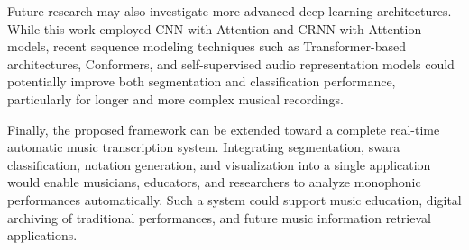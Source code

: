 Future research may also investigate more advanced deep learning architectures. While this work employed CNN with Attention and CRNN with Attention models, recent sequence modeling techniques such as Transformer-based architectures, Conformers, and self-supervised audio representation models could potentially improve both segmentation and classification performance, particularly for longer and more complex musical recordings.

Finally, the proposed framework can be extended toward a complete real-time automatic music transcription system. Integrating segmentation, swara classification, notation generation, and visualization into a single application would enable musicians, educators, and researchers to analyze monophonic performances automatically. Such a system could support music education, digital archiving of traditional performances, and future music information retrieval applications.
